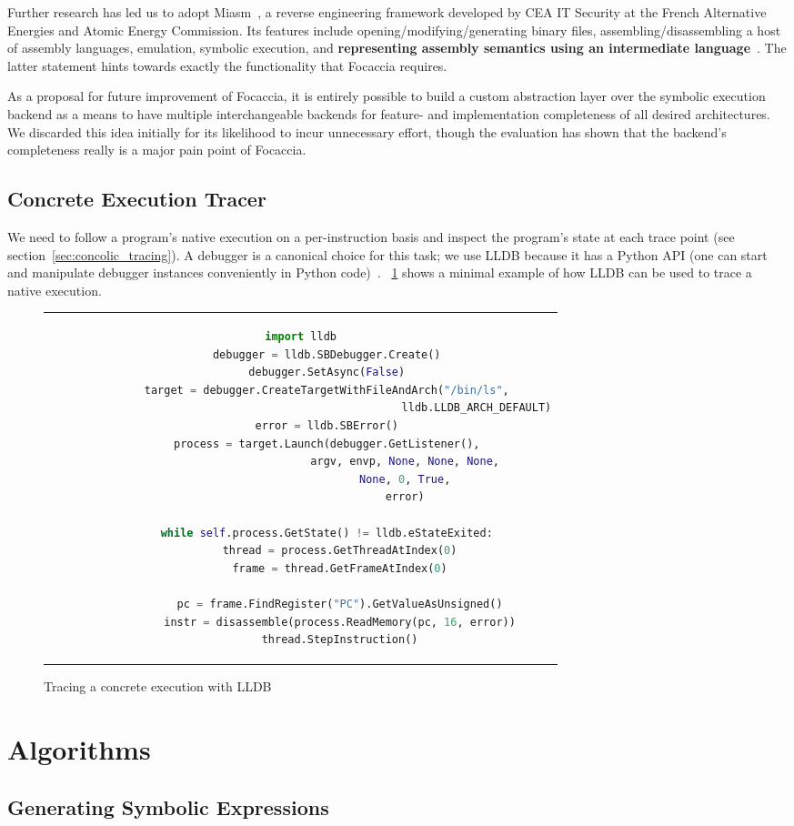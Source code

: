 Further research has led us to adopt Miasm~\cite{desclaux2012miasm}, a reverse engineering framework developed by CEA IT
Security at the French Alternative Energies and Atomic Energy Commission. Its features include
opening/modifying/generating binary files, assembling/disassembling a host of assembly languages, emulation, symbolic
execution, and \textbf{representing assembly semantics using an intermediate language}~\cite{cea-sec2024Mar}. The latter
statement hints towards exactly the functionality that Focaccia requires.

As a proposal for future improvement of Focaccia, it is entirely possible to build a custom abstraction layer over the
symbolic execution backend as a means to have multiple interchangeable backends for feature- and implementation
completeness of all desired architectures. We discarded this idea initially for its likelihood to incur unnecessary
effort, though the evaluation has shown that the backend's completeness really is a major pain point of Focaccia.

\subsection{Concrete Execution Tracer}

We need to follow a program's native execution on a per-instruction basis and inspect the program's state at each trace
point (see section~\ref{sec:concolic_tracing}). A debugger is a canonical choice for this task; we use LLDB because it
has a Python API (one can start and manipulate debugger instances conveniently in Python code)~\cite{lldb2024Apr}.
\lstlistingname~\ref{fig:lldb_tracing} shows a minimal example of how LLDB can be used to trace a native execution.

\begin{figure}[htbp]
    \centering
    \begin{tabular}{c}
    \begin{lstlisting}[language=Python]
        import lldb
        debugger = lldb.SBDebugger.Create()
        debugger.SetAsync(False)
        target = debugger.CreateTargetWithFileAndArch("/bin/ls",
                                                      lldb.LLDB_ARCH_DEFAULT)
        error = lldb.SBError()
        process = target.Launch(debugger.GetListener(),
                                argv, envp, None, None, None,
                                None, 0, True,
                                error)

        while self.process.GetState() != lldb.eStateExited:
            thread = process.GetThreadAtIndex(0)
            frame = thread.GetFrameAtIndex(0)

            pc = frame.FindRegister("PC").GetValueAsUnsigned()
            instr = disassemble(process.ReadMemory(pc, 16, error))
            thread.StepInstruction()
    \end{lstlisting}
    \end{tabular}
    \caption{Tracing a concrete execution with LLDB}\label{fig:lldb_tracing}
\end{figure}

\section{Algorithms}\label{sec:algorithms}

\subsection{Generating Symbolic Expressions}\label{sec:symb_expr_impl}
